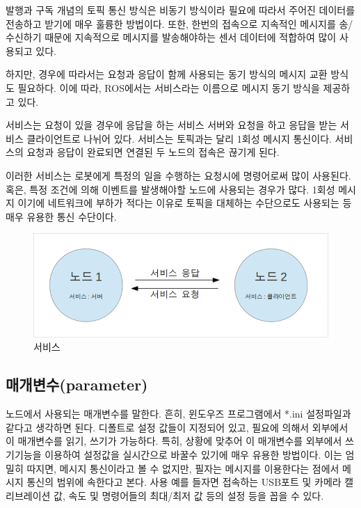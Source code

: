 발행과 구독 개념의 토픽 통신 방식은 비동기 방식이라 필요에 따라서 주어진 데이터를 전송하고 받기에 매우 훌륭한 방법이다. 또한, 한번의 접속으로 지속적인 메시지를 송/수신하기 때문에 지속적으로 메시지를 발송해야하는 센서 데이터에 적합하여 많이 사용되고 있다. 

하지만, 경우에 따라서는 요청과 응답이 함께 사용되는 동기 방식의 메시지 교환 방식도 필요하다. 이에 따라, ROS에서는 서비스라는 이름으로 메시지 동기 방식을 제공하고 있다. 

서비스는 요청이 있을 경우에 응답을 하는 서비스 서버와 요청을 하고 응답을 받는 서비스 클라이언트로 나뉘어 있다. 서비스는 토픽과는 달리 1회성 메시지 통신이다. 서비스의 요청과 응답이 완료되면 연결된 두 노드의 접속은 끊기게 된다. 

이러한 서비스는 로봇에게 특정의 일을 수행하는 요청시에 명령어로써 많이 사용된다. 혹은, 특정 조건에 의해 이벤트를 발생해야할 노드에 사용되는 경우가 많다. 1회성 메시지 이기에 네트워크에 부하가 적다는 이유로 토픽을 대체하는 수단으로도 사용되는 등 매우 유용한 통신 수단이다.

\begin{figure}[h]
\centering\includegraphics[width=0.7\columnwidth]{pictures/chapter7/msgtrans3.png}
\caption{서비스}
\end{figure}

\subsection{매개변수(parameter)}

노드에서 사용되는 매개변수를 말한다. 흔히, 윈도우즈 프로그램에서 *.ini 설정파일과 같다고 생각하면 된다. 디폴트로 설정 값들이 지정되어 있고, 필요에 의해서 외부에서 이 매개변수를 읽기, 쓰기가 가능하다. 특히, 상황에 맞추어 이 매개변수를 외부에서 쓰기기능을 이용하여 설정값을 실시간으로 바꿀수 있기에 매우 유용한 방법이다. 이는 엄밀히 따지면, 메시지 통신이라고 볼 수 없지만, 필자는 메시지를 이용한다는 점에서 메시지 통신의 범위에 속한다고 본다. 사용 예를 들자면 접속하는 USB포트 및 카메라 캘리브레이션 값, 속도 및 명령어들의 최대/최저 값 등의 설정 등을 꼽을 수 있다.

